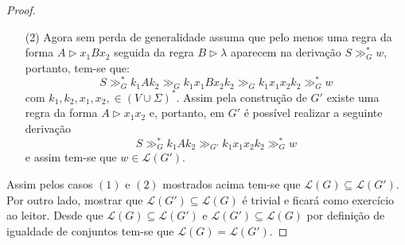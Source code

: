 \begin{proof}
\begin{itemize}
        \item[(2)] Agora sem perda de generalidade assuma que pelo menos uma regra da forma  $A \rhd x_1Bx_2$ seguida da regra $B \rhd \lambda$ aparecem na derivação $S \gg_G^* w$, portanto, tem-se que:
        $$S \gg_G^* k_1Ak_2 \gg_{G} k_1x_1Bx_2k_2 \gg_{G} k_1x_1x_2k_2 \gg^*_G w $$
        com $k_1, k_2, x_1, x_2,  \in (V \cup \Sigma)^*$. Assim pela construção de $G'$ existe uma regra da forma $A \rhd x_1x_2$ e, portanto, em $G'$ é possível realizar a seguinte derivação
        $$S \gg_G^* k_1Ak_2 \gg_{G'} k_1x_1x_2k_2 \gg^*_G w $$
        e assim tem-se que $w \in \mathcal{L}(G')$.
    \end{itemize}
    Assim pelos casos $(1)$ e $(2)$ mostrados acima tem-se que $\mathcal{L}(G) \subseteq \mathcal{L}(G')$. Por outro lado, mostrar que $\mathcal{L}(G') \subseteq \mathcal{L}(G)$ é trivial e ficará como exercício ao leitor. Desde que $\mathcal{L}(G) \subseteq \mathcal{L}(G')$ e $\mathcal{L}(G') \subseteq \mathcal{L}(G)$ por definição de igualdade de conjuntos tem-se que $\mathcal{L}(G) = \mathcal{L}(G')$.
\end{proof}

